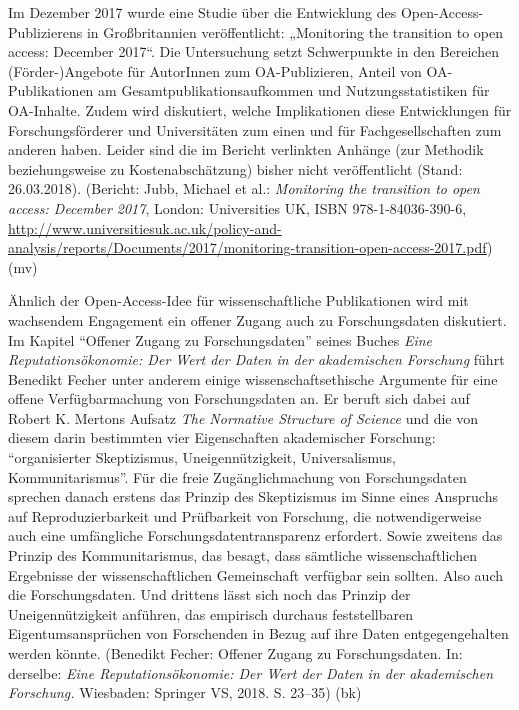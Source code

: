 \documentclass[a4paper,
fontsize=11pt,
oneside,
numbers=noperiodatend,
parskip=half-,
bibliography=totoc,
final
]{scrartcl}
\begin{document}
Im Dezember 2017 wurde eine Studie über die Entwicklung des
Open-Access-Publizierens in Großbritannien veröffentlicht: „Monitoring
the transition to open access: December 2017``. Die Untersuchung setzt
Schwerpunkte in den Bereichen (Förder-)Angebote für AutorInnen zum
OA-Publizieren, Anteil von OA-Publikationen am
Gesamtpublikationsaufkommen und Nutzungsstatistiken für OA-Inhalte.
Zudem wird diskutiert, welche Implikationen diese Entwicklungen für
Forschungsförderer und Universitäten zum einen und für
Fachgesellschaften zum anderen haben. Leider sind die im Bericht
verlinkten Anhänge (zur Methodik beziehungsweise zu Kostenabschätzung)
bisher nicht veröffentlicht (Stand: 26.03.2018). (Bericht: Jubb, Michael
et al.: \emph{Monitoring the transition to open access: December 2017},
London: Universities UK, ISBN 978-1-84036-390-6,
\url{http://www.universitiesuk.ac.uk/policy-and-analysis/reports/Documents/2017/monitoring-transition-open-access-2017.pdf})
(mv)

Ähnlich der Open-Access-Idee für wissenschaftliche Publikationen wird
mit wachsendem Engagement ein offener Zugang auch zu Forschungsdaten
diskutiert. Im Kapitel \enquote{Offener Zugang zu Forschungsdaten}
seines Buches \emph{Eine Reputationsökonomie: Der Wert der Daten in der
akademischen Forschung} führt Benedikt Fecher unter anderem einige
wissenschaftsethische Argumente für eine offene Verfügbarmachung von
Forschungsdaten an. Er beruft sich dabei auf Robert K. Mertons Aufsatz
\emph{The Normative Structure of Science} und die von diesem darin
bestimmten vier Eigenschaften akademischer Forschung:
\enquote{organisierter Skeptizismus, Uneigennützigkeit, Universalismus,
Kommunitarismus}. Für die freie Zugänglichmachung von Forschungsdaten
sprechen danach erstens das Prinzip des Skeptizismus im Sinne eines
Anspruchs auf Reproduzierbarkeit und Prüfbarkeit von Forschung, die
notwendigerweise auch eine umfängliche Forschungsdatentransparenz
erfordert. Sowie zweitens das Prinzip des Kommunitarismus, das besagt,
dass sämtliche wissenschaftlichen Ergebnisse der wissenschaftlichen
Gemeinschaft verfügbar sein sollten. Also auch die Forschungsdaten. Und
drittens lässt sich noch das Prinzip der Uneigennützigkeit anführen, das
empirisch durchaus feststellbaren Eigentumsansprüchen von Forschenden in
Bezug auf ihre Daten entgegengehalten werden könnte. (Benedikt Fecher:
Offener Zugang zu Forschungsdaten. In: derselbe: \emph{Eine
Reputationsökonomie: Der Wert der Daten in der akademischen Forschung.}
Wiesbaden: Springer VS, 2018. S. 23--35) (bk)
\end{document}
